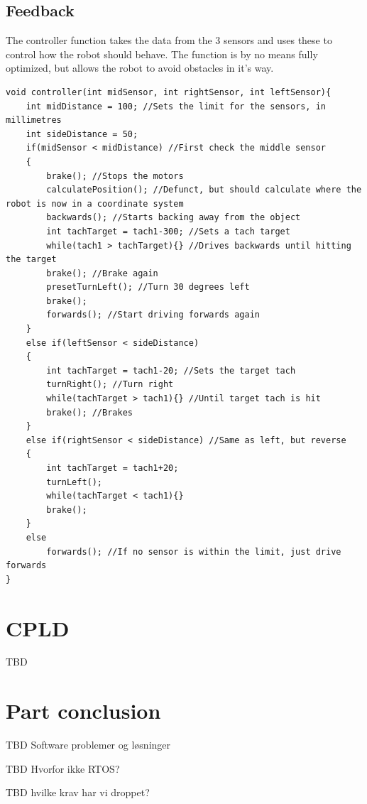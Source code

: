\subsection{Feedback}
The controller function takes the data from the 3 sensors and uses these to control how the robot should behave. The function is by no means fully optimized, but allows the robot to avoid obstacles in it's way.
\begin{lstlisting}
void controller(int midSensor, int rightSensor, int leftSensor){
    int midDistance = 100; //Sets the limit for the sensors, in millimetres
    int sideDistance = 50;
    if(midSensor < midDistance) //First check the middle sensor
    {
        brake(); //Stops the motors
        calculatePosition(); //Defunct, but should calculate where the robot is now in a coordinate system
        backwards(); //Starts backing away from the object
        int tachTarget = tach1-300; //Sets a tach target
        while(tach1 > tachTarget){} //Drives backwards until hitting the target
        brake(); //Brake again
        presetTurnLeft(); //Turn 30 degrees left
        brake();
        forwards(); //Start driving forwards again
    }
    else if(leftSensor < sideDistance)
    {
        int tachTarget = tach1-20; //Sets the target tach
        turnRight(); //Turn right
        while(tachTarget > tach1){} //Until target tach is hit
        brake(); //Brakes
    }
    else if(rightSensor < sideDistance) //Same as left, but reverse
    {
        int tachTarget = tach1+20;
        turnLeft();
        while(tachTarget < tach1){}
        brake();
    }
    else
        forwards(); //If no sensor is within the limit, just drive forwards
}
\end{lstlisting}
\newpage
\section{CPLD}
TBD
\section{Part conclusion}

TBD Software problemer og løsninger

TBD Hvorfor ikke RTOS?

TBD hvilke krav har vi droppet?